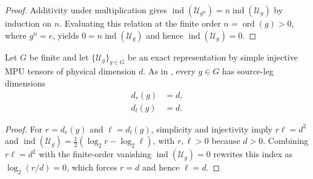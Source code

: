 \begin{proof}\leanok
    Additivity under multiplication gives
    $\operatorname{ind}(\mathcal U_{g^n})=n\operatorname{ind}(\mathcal U_g)$
    by induction on $n$. Evaluating this relation at the finite order
    $n=\operatorname{ord}(g)>0$, where $g^n=e$, yields
    $0=n\operatorname{ind}(\mathcal U_g)$ and hence
    $\operatorname{ind}(\mathcal U_g)=0$.
\end{proof}

\begin{lemma}
    \label{thm:mpug_finite_group_source_ranks}
    \leanok
    Let $G$ be finite and let $\{\mathcal U_g\}_{g\in G}$ be an exact
    representation by simple injective MPU tensors of physical dimension
    $d$. As in \cite[line~1547]{FrancoRubio2025MPUGauging}, every $g\in G$ has
    source-leg dimensions
    \begin{align}
        d_r(g) & =d, \\
        d_l(g) & =d.
    \end{align}
\end{lemma}

\begin{proof}\leanok
    For $r=d_r(g)$ and $\ell=d_l(g)$, simplicity and injectivity imply
    $r\ell=d^2$ and
    $\operatorname{ind}(\mathcal U_g)=\frac12(\log_2 r-\log_2\ell)$, with
    $r,\ell>0$ because $d>0$. Combining $r\ell=d^2$ with the finite-order
    vanishing $\operatorname{ind}(\mathcal U_g)=0$ rewrites this index as
    $\log_2(r/d)=0$, which forces $r=d$ and hence $\ell=d$.
\end{proof}
